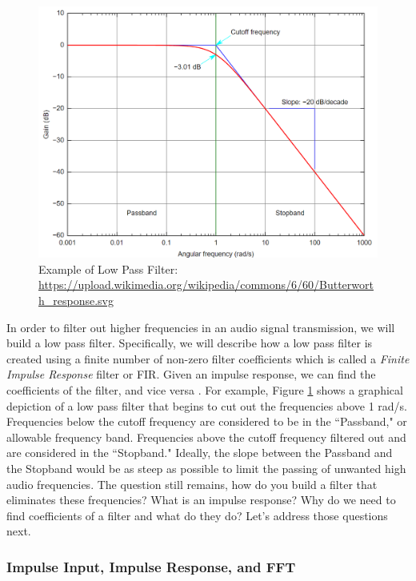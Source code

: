 \begin{figure}[h!]
	\centering
	\includegraphics[scale = .5]{low_pass.png} %
	\caption{Example of Low Pass Filter: \url{https://upload.wikimedia.org/wikipedia/commons/6/60/Butterworth_response.svg}}
	\label{fig:lowpass}
\end{figure}    

In order to filter out higher frequencies in an audio signal transmission, we will build a low pass filter.  Specifically, we will describe how a low pass filter is created using a finite number of non-zero filter coefficients which is called a \textit{Finite Impulse Response} filter or FIR.  Given an impulse response, we can find the coefficients of the filter, and vice versa \cite{notes:class}.  For example, Figure \ref{fig:lowpass} shows a graphical depiction of a low pass filter that begins to cut out the frequencies above 1 rad/s.  Frequencies below the cutoff frequency are considered to be in the ``Passband," or allowable frequency band.  Frequencies above the cutoff frequency filtered out and are considered in the ``Stopband."  Ideally, the slope between the Passband and the Stopband would be as steep as possible to limit the passing of unwanted high audio frequencies.  The question still remains, how do you build a filter that eliminates these frequencies?  What is an impulse response?  Why do we need to find coefficients of a filter and what do they do?  Let's address those questions next. 

\subsubsection{Impulse Input, Impulse Response, and FFT}

